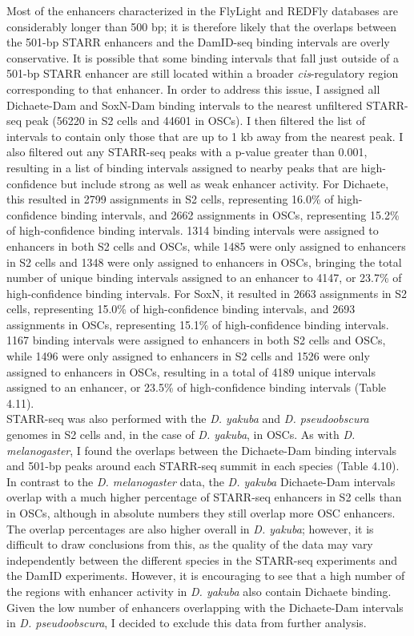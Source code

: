 Most of the enhancers characterized in the FlyLight and REDFly databases are considerably longer than 500 bp; it is therefore likely that the overlaps between the 501-bp STARR enhancers and the DamID-seq binding intervals are overly conservative. It is possible that some binding intervals that fall just outside of a 501-bp STARR enhancer are still located within a broader \emph{cis}-regulatory region corresponding to that enhancer. In order to address this issue, I assigned all Dichaete-Dam and SoxN-Dam binding intervals to the nearest unfiltered STARR-seq peak (56220 in S2 cells and 44601 in OSCs). I then filtered the list of intervals to contain only those that are up to 1 kb away from the nearest peak. I also filtered out any STARR-seq peaks with a p-value greater than 0.001, resulting in a list of binding intervals assigned to nearby peaks that are high-confidence but include strong as well as weak enhancer activity. For Dichaete, this resulted in 2799 assignments in S2 cells, representing 16.0\% of high-confidence binding intervals, and 2662 assignments in OSCs, representing 15.2\% of high-confidence binding intervals. 1314 binding intervals were assigned to enhancers in both S2 cells and OSCs, while 1485 were only assigned to enhancers in S2 cells and 1348 were only assigned to enhancers in OSCs, bringing the total number of unique binding intervals assigned to an enhancer to 4147, or 23.7\% of high-confidence binding intervals. For SoxN, it resulted in 2663 assignments in S2 cells, representing 15.0\% of high-confidence binding intervals, and 2693 assignments in OSCs, representing 15.1\% of high-confidence binding intervals. 1167 binding intervals were assigned to enhancers in both S2 cells and OSCs, while 1496 were only assigned to enhancers in S2 cells and 1526 were only assigned to enhancers in OSCs, resulting in a total of 4189 unique intervals assigned to an enhancer, or 23.5\% of high-confidence binding intervals (Table 4.11).\\

STARR-seq was also performed with the \emph{D. yakuba} and \emph{D. pseudoobscura} genomes in S2 cells and, in the case of \emph{D. yakuba}, in OSCs. As with \emph{D. melanogaster}, I found the overlaps between the Dichaete-Dam binding intervals and 501-bp peaks around each STARR-seq summit in each species (Table 4.10). In contrast to the \emph{D. melanogaster} data, the \emph{D. yakuba} Dichaete-Dam intervals overlap with a much higher percentage of STARR-seq enhancers in S2 cells than in OSCs, although in absolute numbers they still overlap more OSC enhancers. The overlap percentages are also higher overall in \emph{D. yakuba}; however, it is difficult to draw conclusions from this, as the quality of the data may vary independently between the different species in the STARR-seq experiments and the DamID experiments. However, it is encouraging to see that a high number of the regions with enhancer activity in \emph{D. yakuba} also contain Dichaete binding. Given the low number of enhancers overlapping with the Dichaete-Dam intervals in \emph{D. pseudoobscura}, I decided to exclude this data from further analysis.\\

